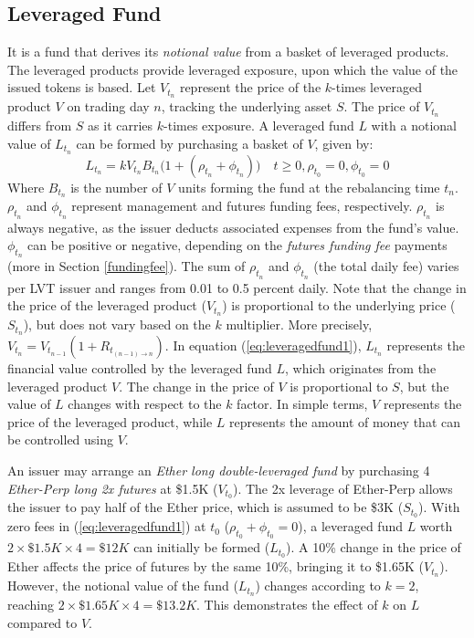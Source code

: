 \subsection{Leveraged Fund}\label{subsec:leveragedfund}
It is a fund that derives its \textsl{notional value} from a basket of leveraged products. The leveraged products provide leveraged exposure, upon which the value of the issued tokens is based. Let $V_{t_{n}}$ represent the price of the $k$-times leveraged product $V$ on trading day $n$, tracking the underlying asset $S$. The price of $V_{t_{n}}$ differs from $S$ as it carries $k$-times exposure. A leveraged fund $L$ with a notional value of $L_{t_{n}}$ can be formed by purchasing a basket of $V$, given by:
\begin{equation}\label{eq:leveragedfund1}
	L_{t_{n}}=kV_{t_{n}}B_{t_{n}}\big(1+(\rho_{t_{n}}+\phi_{t_{n}})\big)\quad t \ge 0, \rho_{t_{0}}=0, \phi_{t_{0}}=0
\end{equation}
Where $B_{t_{n}}$ is the number of $V$ units forming the fund at the rebalancing time $t_{n}$. $\rho_{t_{n}}$ and $\phi_{t_{n}}$ represent management and futures funding fees, respectively. $\rho_{t_{n}}$ is always negative, as the issuer deducts associated expenses from the fund's value. $\phi_{t_{n}}$ can be positive or negative, depending on the \textsl{futures funding fee} payments (more in Section \ref{fundingfee}). The sum of $\rho_{t_{n}}$ and $\phi_{t_{n}}$ (\ie the total daily fee) varies per LVT issuer and ranges from 0.01 to 0.5 percent daily. Note that the change in the price of the leveraged product ($V_{t_{n}}$) is proportional to the underlying price ($S_{t_{n}}$), but does not vary based on the $k$ multiplier. More precisely, $V_{t_{n}} = V_{t_{n-1}}(1+R_{t_{(n-1)\to n}})$. In equation (\ref{eq:leveragedfund1}), $L_{t_{n}}$ represents the financial value controlled by the leveraged fund $L$, which originates from the leveraged product $V$. The change in the price of $V$ is proportional to $S$, but the value of $L$ changes with respect to the $k$ factor. In simple terms, $V$ represents the price of the leveraged product, while $L$ represents the amount of money that can be controlled using $V$.
\begin{example}\label{ex:eth2l_1}
	An issuer may arrange an \textsl{Ether long double-leveraged fund} by purchasing 4 \textsl{Ether-Perp long 2x futures} at \$1.5K ($V_{t_{0}}$). The 2x leverage of Ether-Perp allows the issuer to pay half of the Ether price, which is assumed to be \$3K ($S_{t_{0}}$). With zero fees in (\ref{eq:leveragedfund1}) at $t_{0}$ ($\rho_{t_{0}}+\phi_{t_{0}}=0$), a leveraged fund $L$ worth $2\times{\$1.5K}\times{4}=\$12K$ can initially be formed ($L_{t_{0}}$). A 10\% change in the price of Ether affects the price of futures by the same 10\%, bringing it to \$1.65K ($V_{t_{n}}$). However, the notional value of the fund ($L_{t_{n}}$) changes according to $k=2$, reaching $2\times{\$1.65K}\times{4}=\$13.2K$. This demonstrates the effect of $k$ on $L$ compared to $V$.
\end{example}

